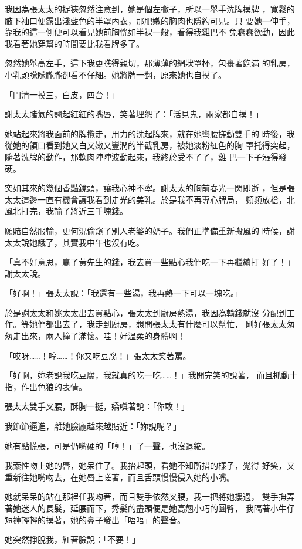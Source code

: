 我因為張太太的捉狹忽然注意到，她是個左撇子，所以一舉手洗牌摸牌
，寬鬆的腋下袖口便露出淺藍色的半罩內衣，那肥嫩的胸肉也隱約可見。只
要她一伸手，靠我的這一側便可以看見她前胸恍如半裸一般，看得我雞巴不
免蠢蠢欲動，因此我看著她穿幫的時間要比我看牌多了。

忽然她舉高左手，這下我更瞧得親切，那薄薄的網狀罩杯，包裹著飽滿
的乳房，小乳頭矇矇朧朧卻看不仔細。她將牌一翻，原來她也自摸了。

「門清一摸三，白皮，四台！」

謝太太賭氣的翹起紅紅的嘴唇，笑著埋怨了：「活見鬼，兩家都自摸！」

她站起來將我面前的牌攬走，用力的洗起牌來，就在她彎腰搓動雙手的
時後，我從她的領口看到她又白又嫩又豐潤的半截乳房，被她淡粉紅色的胸
罩托得突起，隨著洗牌的動作，那軟肉陣陣波動起來，我終於受不了了，雞
巴一下子漲得發硬。

突如其來的幾個香豔鏡頭，讓我心神不寧。謝太太的胸前春光一閃即逝
，但是張太太這邊一直有機會讓我看到走光的美乳。於是我不再專心牌局，
頻頻放槍，北風北打完，我輸了將近三千塊錢。

願賭自然服輸，更何況偷窺了別人老婆的奶子。我們正準備重新搬風的
時候，謝太太說她餓了，其實我中午也沒有吃。

「真不好意思，贏了黃先生的錢，我去買一些點心我們吃一下再繼續打
好了！」謝太太說。

「好啊！」張太太說：「我還有一些湯，我再熱一下可以一塊吃。」

於是謝太太和姚太太出去買點心，張太太到廚房熱湯，我因為輸錢就沒
分配到工作。等她們都出去了，我走到廚房，想問張太太有什麼可以幫忙，
剛好張太太匆匆走出來，兩人撞了滿懷。哇！好溫柔的身體啊！

「哎呀……！哼……！你又吃豆腐！」張太太笑著罵。

「好啊，妳老說我吃豆腐，我就真的吃一吃……！」我開完笑的說著，
而且抓動十指，作出色狼的表情。

張太太雙手叉腰，酥胸一挺，嬌嗔著說：「你敢！」

我節節逼進，離她臉龐越來越貼近：「妳說呢？」

她有點慌張，可是仍嘴硬的「哼！」了一聲，也沒退縮。

我索性吻上她的唇，她呆住了。我抬起頭，看她不知所措的樣子，覺得
好笑，又重新往她嘴吻去，在她唇上嗟著，而且舌頭慢慢侵入她的小嘴。

她就呆呆的站在那裡任我吻著，而且雙手依然叉腰，我一把將她摟過，
雙手撫弄著她迷人的長髮，延腰而下，秀髮的盡頭便是她高翹小巧的圓臀，
我隔著小牛仔短褲輕輕的摸著，她的鼻子發出「唔唔」的聲音。

她突然掙脫我，紅著臉說：「不要！」

